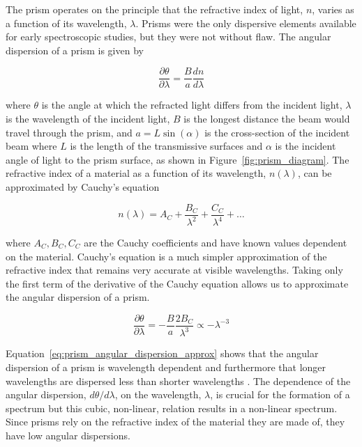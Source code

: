 The prism operates on the principle that the refractive index of light, $n$, varies as a function of its wavelength, $\lambda$. Prisms were the only dispersive elements available for early spectroscopic studies, but they were not without flaw. The angular dispersion of a prism is given by

\begin{equation}
  \frac{\partial \theta}{\partial \lambda} = \frac{B}{a}\frac{dn}{d\lambda}%
  \label{eq:prism_angular_dispersion}
\end{equation}

\noindent where $\theta$ is the angle at which the refracted light differs from the incident light, $\lambda$ is the wavelength of the incident light, $B$ is the longest distance the beam would travel through the prism, and $a = L \sin(\alpha)$ is the cross-section of the incident beam where $L$ is the length of the transmissive surfaces and $\alpha$ is the incident angle of light to the prism surface, as shown in Figure~\ref{fig:prism_diagram}. The refractive index of a material as a function of its wavelength, $n(\lambda)$, can be approximated by Cauchy's equation

\begin{equation}
  n(\lambda) = A_{C} + \frac{B_{C}}{\lambda^{2}} + \frac{C_{C}}{\lambda^{4}} + \dots
  \label{eq:Cauchy}
\end{equation}

\noindent where $A_{C}, B_{C}, C_{C}$ are the Cauchy coefficients and have known values dependent on the material. Cauchy's equation is a much simpler approximation of the refractive index that remains very accurate at visible wavelengths. Taking only the first term of the derivative of the Cauchy equation allows us to approximate the angular dispersion of a prism.

\begin{equation}
  \frac{\partial \theta}{\partial \lambda} = -\frac{B}{a}\frac{2B_{C}}{\lambda^{3}} \propto -\lambda^{-3}
  \label{eq:prism_angular_dispersion_approx}
\end{equation}

Equation~\ref{eq:prism_angular_dispersion_approx} shows that the angular dispersion of a prism is wavelength dependent and furthermore that longer wavelengths are dispersed less than shorter wavelengths \citep{BirneyObsAstro, Hecht_optics}. The dependence of the angular dispersion, $d\theta/d\lambda$, on the wavelength, $\lambda$, is crucial for the formation of a spectrum but this cubic, non-linear, relation results in a non-linear spectrum. Since prisms rely on the refractive index of the material they are made of, they have low angular dispersions.
\prgph

